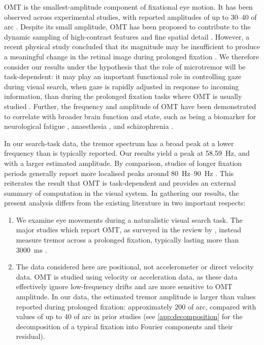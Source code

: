 OMT is the smallest-amplitude component of fixational eye motion. It has been observed across experimental studies, with reported amplitudes of up to \qtyrange{30}{40}{\sec} of arc \cite{ryle_simultaneous_2015, alkalbani2010thesis}. Despite its small amplitude, OMT has been proposed to contribute to the dynamic sampling of high-contrast features and fine spatial detail \cite{rucci_miniature_2007, rucci_temporal_2018, rucci_unsteady_2015, roberts_fixational_2013}. However, a recent physical study concluded that its magnitude may be insufficient to produce a meaningful change in the retinal image during prolonged fixation \cite{bowers_effects_2019}. We therefore consider our results under the hypothesis that the role of microtremor will be task-dependent: it may play an important functional role in controlling gaze during visual search, when gaze is rapidly adjusted in response to incoming information, than during the prolonged fixation tasks where OMT is usually studied \cite{ko_eye_2016, alkalbani2010thesis, ryle_simultaneous_2015}. Further, the frequency and amplitude of OMT have been demonstrated to correlate with broader brain function and state, such as being a biomarker for neurological fatigue \cite{lyapunov2022fatigue}, anaesthesia \cite{bojanic2001anaesthesia, heaney2004anesthesia, kevin2002bis}, and schizophrenia \cite{shoshina2023procedia}.

In our search-task data, the tremor spectrum has a broad peak at a lower frequency than is typically reported. Our results yield a peak at \qty{58.59}{\hertz}, and with a larger estimated amplitude. By comparison, studies of longer fixation periods generally report more localised peaks around \qtyrange{80}{90}{\hertz} \cite{graham_ocular_2023}. This reiterates the result that OMT is task-dependent and provides an external summary of computation in the visual system. In gathering our results, the present analysis differs from the existing literature in two important respects:
\begin{enumerate}
    \item We examine eye movements during a naturalistic visual search task. The major studies which report OMT, as surveyed in the review by \textcite{graham_ocular_2023}, instead measure tremor across a prolonged fixation, typically lasting more than \qty{3000}{\milli \second} \cite{ko_eye_2016, alkalbani2010thesis, ryle_simultaneous_2015}.
    \item The data considered here are positional, not accelerometer or direct velocity data. OMT is studied using velocity or acceleration data, as these data effectively ignore low-frequency drifts and are more sensitive to OMT amplitude. In our data, the estimated tremor amplitude is larger than values reported during prolonged fixation: approximately \qty{200}{\sec} of arc, compared with values of up to \qty{40}{\sec} of arc in prior studies \cite{ryle_simultaneous_2015, alkalbani2010thesis} (see \cref{app:decomposition} for the decomposition of a typical fixation into Fourier components and their residual). 
\end{enumerate}

